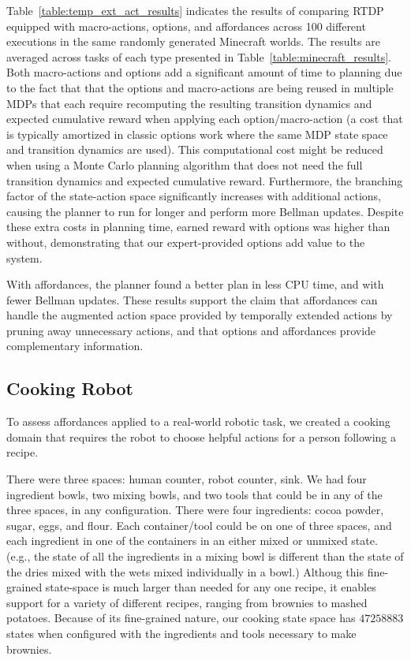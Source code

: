 \documentclass[letterpaper]{article}
\begin{document}
Table~\ref{table:temp_ext_act_results} indicates the results of
comparing RTDP equipped with macro-actions, options, and affordances
across 100 different executions in the same randomly generated
Minecraft worlds. The results are averaged across tasks of each type
presented in Table~\ref{table:minecraft_results}. Both macro-actions
and options add a significant amount of time to planning due to the
fact that that the options and macro-actions are being reused in
multiple MDPs that each require recomputing the resulting transition
dynamics and expected cumulative reward when applying each
option/macro-action (a cost that is typically amortized in classic
options work where the same MDP state space and transition dynamics
are used). This computational cost might be reduced when using a Monte
Carlo planning algorithm that does not need the full transition
dynamics and expected cumulative reward.  Furthermore, the branching
factor of the state-action space significantly increases with
additional actions, causing the planner to run for longer and perform
more Bellman updates.  Despite these extra costs in planning time,
earned reward with options was higher than without, demonstrating that
our expert-provided options add value to the system.

With affordances, the planner found a better plan in less CPU time,
and with fewer Bellman updates. These results support the claim that
affordances can handle the augmented action space provided by
temporally extended actions by pruning away unnecessary actions, and
that options and affordances provide complementary information.

\subsection{Cooking Robot}

To assess affordances applied to a real-world robotic task, we created
a cooking domain that requires the robot to choose helpful actions for
a person following a recipe.  

There were three spaces: human counter, robot counter, sink.  We had
four ingredient bowls, two mixing bowls, and two tools that could be
in any of the three spaces, in any configuration.  There were four
ingredients: cocoa powder, sugar, eggs, and flour.  Each
container/tool could be on one of three spaces, and each ingredient in
one of the containers in an either mixed or unmixed state.  (e.g., the
state of all the ingredients in a mixing bowl is different than the
state of the dries mixed with the wets mixed individually in a bowl.)
Althoug this fine-grained state-space is much larger than needed for
any one recipe, it enables support for a variety of different recipes,
ranging from brownies to mashed potatoes.  Because of its
fine-grained nature, our cooking state space has
$\num[round-precision=3, round-mode=figures]{47258883}$ states when
configured with the ingredients and tools necessary to make brownies.
\end{document}
